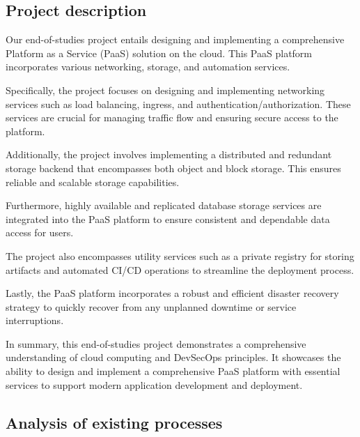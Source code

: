 \subsection{Project description }

Our end-of-studies project entails designing and implementing a comprehensive Platform as a Service (PaaS) solution on the cloud. This PaaS platform incorporates various networking, storage, and automation services.

Specifically, the project focuses on designing and implementing networking services such as load balancing, ingress, and authentication/authorization. These services are crucial for managing traffic flow and ensuring secure access to the platform.

Additionally, the project involves implementing a distributed and redundant storage backend that encompasses both object and block storage. This ensures reliable and scalable storage capabilities.

Furthermore, highly available and replicated database storage services are integrated into the PaaS platform to ensure consistent and dependable data access for users.

The project also encompasses utility services such as a private registry for storing artifacts and automated CI/CD operations to streamline the deployment process.

Lastly, the PaaS platform incorporates a robust and efficient disaster recovery strategy to quickly recover from any unplanned downtime or service interruptions.

In summary, this end-of-studies project demonstrates a comprehensive understanding of cloud computing and DevSecOps principles. It showcases the ability to design and implement a comprehensive PaaS platform with essential services to support modern application development and deployment. 

\subsection{Analysis of existing processes }


